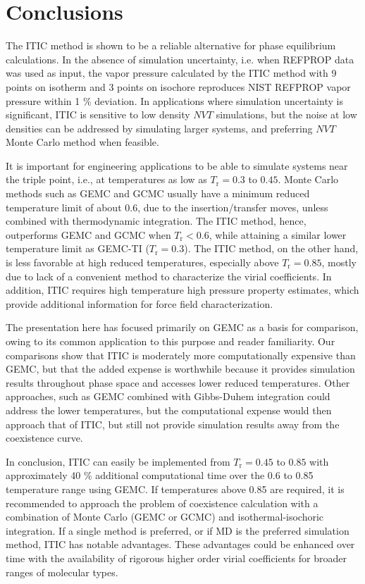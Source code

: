 \documentclass[5p,times]{elsarticle}
\begin{document}
\section{Conclusions} \label{sec:conclusion} 
The ITIC method is shown to be a reliable alternative for phase equilibrium calculations. In the absence of simulation uncertainty, i.e. when REFPROP data was used as input, the vapor pressure calculated by the ITIC method with 9 points on isotherm and 3 points on isochore reproduces NIST REFPROP vapor pressure within 1 \% deviation. In applications where simulation uncertainty is significant, ITIC is sensitive to low density $NVT$ simulations, but the noise at low densities can be addressed by simulating larger systems, and preferring $NVT$ Monte Carlo method when feasible.

It is important for engineering applications to be able to simulate systems near the triple point, i.e., at temperatures as low as $T_\mathrm{r} = 0.3$ to $0.45$.  Monte Carlo methods such as GEMC and GCMC usually have a minimum reduced temperature limit of about 0.6, due to the insertion/transfer moves, unless combined with thermodynamic integration. The ITIC method, hence, outperforms GEMC and GCMC when $T_\mathrm{r}<0.6$, while attaining a similar lower temperature limit as GEMC-TI ($T_\mathrm{r} = 0.3$). The ITIC method, on the other hand, is less favorable at high reduced temperatures, especially above $T_\mathrm{r}=0.85$, mostly due to lack of a convenient method to characterize the virial coefficients. In addition, ITIC requires high temperature high pressure property estimates, which provide additional information for force field characterization.



The presentation here has focused primarily on GEMC as a basis for comparison, owing to its common application to this purpose and reader familiarity. Our comparisons show that ITIC is moderately more computationally expensive than GEMC, but that the added expense is worthwhile because it provides simulation results throughout phase space and accesses lower reduced temperatures. Other approaches, such as GEMC combined with Gibbs-Duhem integration could address the lower temperatures, but the computational expense would then approach that of ITIC, but still not provide simulation results away from the coexistence curve.


In conclusion, ITIC can easily be implemented from $T_\mathrm{r} = 0.45$ to $0.85$ with approximately 40 \% additional computational time over the 0.6 to 0.85 temperature range using GEMC. If temperatures above 0.85 are required, it is recommended to approach the problem of coexistence calculation with a combination of Monte Carlo (GEMC or GCMC) and isothermal-isochoric integration. If a single method is preferred, or if MD is the preferred simulation method, ITIC has notable advantages. These advantages could be enhanced over time with the availability of rigorous higher order virial coefficients for broader ranges of molecular types. 
\end{document}
